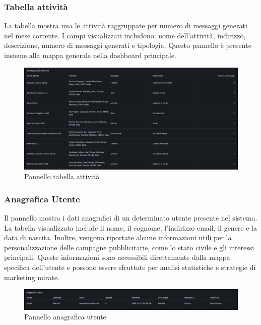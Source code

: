 \documentclass[10pt]{article}
\begin{document}
\begin{justify}
    \subsubsection{Tabella attività}
    La tabella mostra una le attività raggruppate per numero di messaggi generati nel mese corrente. I campi visualizzati includono: nome dell'attività, indirizzo, descrizione, numero di messaggi generati e tipologia. Questo pannello è presente insieme alla mappa generale nella dashboard principale.
    \begin{figure}[H]
    \centering
    \includegraphics[width=1\linewidth]{tabella.png}
    \caption{Pannello tabella attività}
    \end{figure}

    \subsubsection{Anagrafica Utente}
    Il pannello mostra i dati anagrafici di un determinato utente presente nel sistema. La tabella visualizzata include il nome, il cognome, l'indirizzo email, il genere e la data di nascita. Inoltre, vengono riportate alcune informazioni utili per la personalizzazione delle campagne pubblicitarie, come lo stato civile e gli interessi principali. Queste informazioni sono accessibili direttamente dalla mappa specifica dell'utente e possono essere sfruttate per analisi statistiche e strategie di marketing mirate.  
    \begin{figure}[H]
    \centering
    \includegraphics[width=1\linewidth]{anagrafica.png}
    \caption{Pannello anagrafica utente}
    \end{figure}




\end{justify}
\end{document}

